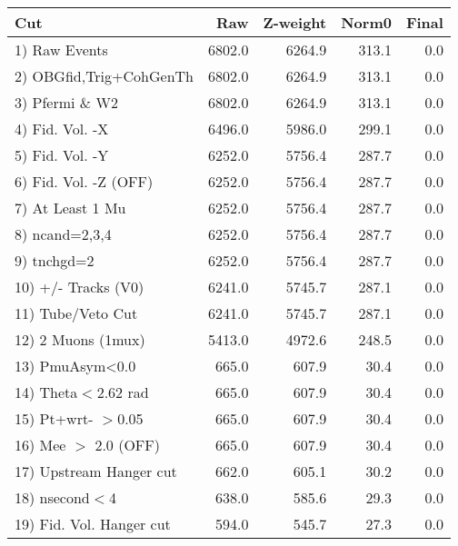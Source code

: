  \begin{table}[h!]\centering
 \begin{tabular}{||l||r|r|r|r||}
 \hline
 \hline
 Cut & Raw & Z-weight & Norm0 & Final \\
 \hline
  1) Raw Events           &      6802.0 &      6264.9 &       313.1 &         0.0 \\
  2) OBGfid,Trig+CohGenTh &      6802.0 &      6264.9 &       313.1 &         0.0 \\
  3) Pfermi \& W2         &      6802.0 &      6264.9 &       313.1 &         0.0 \\
  4) Fid. Vol. -X         &      6496.0 &      5986.0 &       299.1 &         0.0 \\
  5) Fid. Vol. -Y         &      6252.0 &      5756.4 &       287.7 &         0.0 \\
  6) Fid. Vol. -Z (OFF)   &      6252.0 &      5756.4 &       287.7 &         0.0 \\
  7) At Least 1 Mu        &      6252.0 &      5756.4 &       287.7 &         0.0 \\
  8) ncand=2,3,4          &      6252.0 &      5756.4 &       287.7 &         0.0 \\
  9) tnchgd=2             &      6252.0 &      5756.4 &       287.7 &         0.0 \\
 10) +/- Tracks (V0)      &      6241.0 &      5745.7 &       287.1 &         0.0 \\
 11) Tube/Veto Cut        &      6241.0 &      5745.7 &       287.1 &         0.0 \\
 12) 2 Muons (1mux)       &      5413.0 &      4972.6 &       248.5 &         0.0 \\
 13) PmuAsym<0.0          &       665.0 &       607.9 &        30.4 &         0.0 \\
 14) Theta$<$2.62 rad     &       665.0 &       607.9 &        30.4 &         0.0 \\
 15) Pt+wrt- $>$0.05      &       665.0 &       607.9 &        30.4 &         0.0 \\
 16) Mee $>$ 2.0  (OFF)   &       665.0 &       607.9 &        30.4 &         0.0 \\
 17) Upstream Hanger cut  &       662.0 &       605.1 &        30.2 &         0.0 \\
 18) nsecond$<$4          &       638.0 &       585.6 &        29.3 &         0.0 \\
 19) Fid. Vol. Hanger cut &       594.0 &       545.7 &        27.3 &         0.0 \\

\end{tabular}
\end{table}
